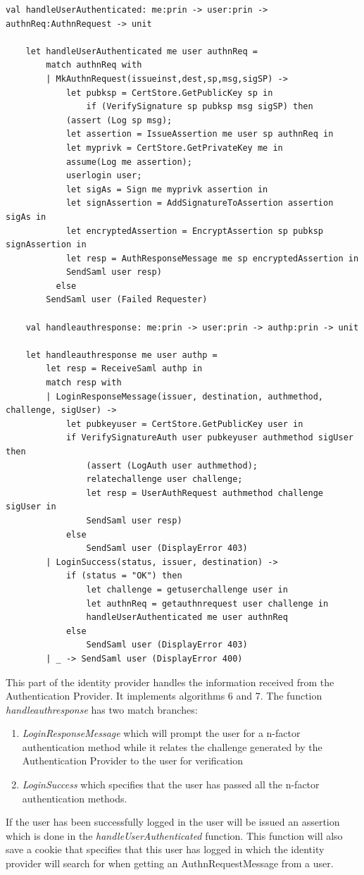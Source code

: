 \documentclass[twosided]{report}
\begin{document}
\clearpage
\begin{lstlisting}[style=fstar, caption={The handling of the responses from Authentication Provider}]
	val handleUserAuthenticated: me:prin -> user:prin -> authnReq:AuthnRequest -> unit

	let handleUserAuthenticated me user authnReq = 
		match authnReq with
		| MkAuthnRequest(issueinst,dest,sp,msg,sigSP) ->
			let pubksp = CertStore.GetPublicKey sp in
				if (VerifySignature sp pubksp msg sigSP) then
			(assert (Log sp msg);
			let assertion = IssueAssertion me user sp authnReq in
			let myprivk = CertStore.GetPrivateKey me in
			assume(Log me assertion);
			userlogin user;
			let sigAs = Sign me myprivk assertion in
			let signAssertion = AddSignatureToAssertion assertion sigAs in
			let encryptedAssertion = EncryptAssertion sp pubksp signAssertion in
			let resp = AuthResponseMessage me sp encryptedAssertion in
			SendSaml user resp)
	      else
		SendSaml user (Failed Requester)

	val handleauthresponse: me:prin -> user:prin -> authp:prin -> unit

	let handleauthresponse me user authp =
		let resp = ReceiveSaml authp in
		match resp with
		| LoginResponseMessage(issuer, destination, authmethod, challenge, sigUser) ->
			let pubkeyuser = CertStore.GetPublicKey user in
			if VerifySignatureAuth user pubkeyuser authmethod sigUser then
				(assert (LogAuth user authmethod);
				relatechallenge user challenge;
				let resp = UserAuthRequest authmethod challenge sigUser in
				SendSaml user resp)
			else
				SendSaml user (DisplayError 403)
		| LoginSuccess(status, issuer, destination) ->
			if (status = "OK") then
				let challenge = getuserchallenge user in
				let authnReq = getauthnrequest user challenge in
				handleUserAuthenticated me user authnReq
			else 
				SendSaml user (DisplayError 403)
		| _ -> SendSaml user (DisplayError 400)
\end{lstlisting}

This part of the identity provider handles the information received from the Authentication Provider. It implements algorithms 6 and 7. The function \emph{handleauthresponse} has two match branches:
\begin{enumerate}
\item \emph{LoginResponseMessage} which will prompt the user for a n-factor authentication method while it relates the challenge generated by the Authentication Provider to the user for verification
\item \emph{LoginSuccess} which specifies that the user has passed all the n-factor authentication methods. 
\end{enumerate}
If the user has been successfully logged in the user will be issued an assertion which is done in the \emph{handleUserAuthenticated} function. This function will also save a cookie that specifies that this user has logged in which the identity provider will search for when getting an AuthnRequestMessage from a user.
\end{document}
